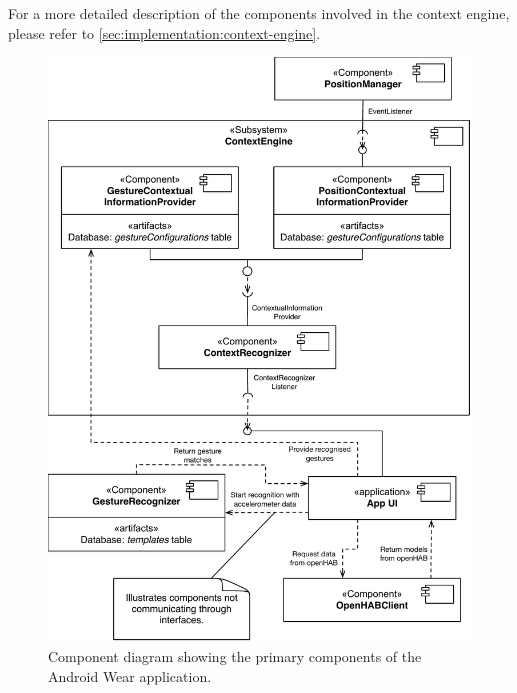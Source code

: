 For a more detailed description of the components involved in the context engine, please refer to \cref{sec:implementation:context-engine}.

\begin{figure}[h!]
\centering
\includegraphics[width=\textwidth]{images/component-diagram-wear}
\caption{Component diagram showing the primary components of the Android Wear application.}
\label{fig:implementation:component-diagram:wear}
\end{figure}

